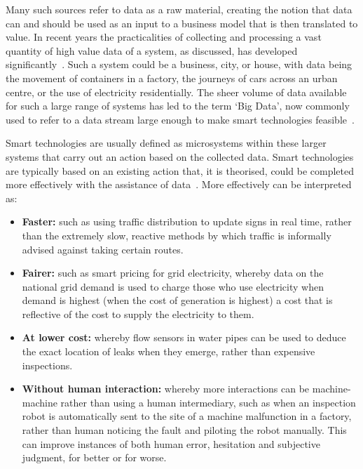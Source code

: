 \documentclass[conference]{IEEEtran}
\begin{document}
Many such sources refer to data as a raw material, creating the notion
that data can and should be used as an input to a business model that
is then translated to value. In recent years the practicalities of
collecting and processing a vast quantity of high value data of a
system, as discussed, has developed
significantly~\cite{arup-et-al:2011}. Such a system could be a
business, city, or house, with data being the movement of containers
in a factory, the journeys of cars across an urban centre, or the use
of electricity residentially. The sheer volume of data available for
such a large range of systems has led to the term `Big Data’, now
commonly used to refer to a data stream large enough to make smart
technologies feasible~\cite{hollands:2008,ibmsmartcities:2009,ciscoconcities:2010}.

Smart technologies are usually defined as microsystems within these
larger systems that carry out an action based on the collected
data. Smart technologies are typically based on an existing action
that, it is theorised, could be completed more effectively with the
assistance of data~\cite{arup-et-al:2011}. More effectively can be
interpreted as:

\begin{itemize}
\item {\textbf{Faster:}} such as using traffic distribution to update
  signs in real time, rather than the extremely slow, reactive methods
  by which traffic is informally advised against taking certain
  routes.
\item {\textbf{Fairer:}} such as smart pricing for grid electricity,
  whereby data on the national grid demand is used to charge those who
  use electricity when demand is highest (when the cost of generation
  is highest) a cost that is reflective of the cost to supply the
  electricity to them. 
\item {\textbf{At lower cost:}} whereby flow sensors in water pipes
  can be used to deduce the exact location of leaks when they emerge,
  rather than expensive inspections.
\item {\textbf{Without human interaction:}} whereby more interactions
  can be machine-machine rather than using a human intermediary, such
  as when an inspection robot is automatically sent to the site of a
  machine malfunction in a factory, rather than human noticing the
  fault and piloting the robot manually. This can improve instances of
  both human error, hesitation and subjective judgment, for better or
  for worse. 
\end{itemize}
\end{document}
